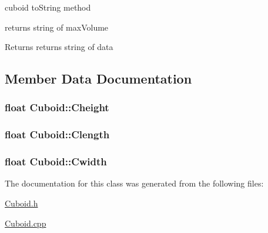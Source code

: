 cuboid to\+String method 

returns string of max\+Volume

\begin{DoxyReturn}{Returns}
returns string of data 
\end{DoxyReturn}


\subsection{Member Data Documentation}
\subsubsection[{\texorpdfstring{Cheight}{Cheight}}]{\setlength{\rightskip}{0pt plus 5cm}float Cuboid\+::\+Cheight\hspace{0.3cm}{\ttfamily [private]}}\hypertarget{classCuboid_a3a154b6556269c3fe860adc2b94c72f0}{}\label{classCuboid_a3a154b6556269c3fe860adc2b94c72f0}
\subsubsection[{\texorpdfstring{Clength}{Clength}}]{\setlength{\rightskip}{0pt plus 5cm}float Cuboid\+::\+Clength\hspace{0.3cm}{\ttfamily [private]}}\hypertarget{classCuboid_a81c027d89a60cf2e4ea2ea1439e6be33}{}\label{classCuboid_a81c027d89a60cf2e4ea2ea1439e6be33}
\subsubsection[{\texorpdfstring{Cwidth}{Cwidth}}]{\setlength{\rightskip}{0pt plus 5cm}float Cuboid\+::\+Cwidth\hspace{0.3cm}{\ttfamily [private]}}\hypertarget{classCuboid_af74f3dfda4a5c2a1589d6a3c4eb011cd}{}\label{classCuboid_af74f3dfda4a5c2a1589d6a3c4eb011cd}


The documentation for this class was generated from the following files\+:\begin{DoxyCompactItemize}
\item 
\hyperlink{Cuboid_8h}{Cuboid.\+h}\item 
\hyperlink{Cuboid_8cpp}{Cuboid.\+cpp}\end{DoxyCompactItemize}
